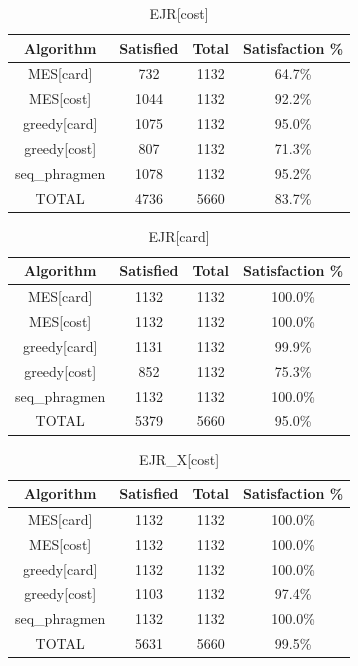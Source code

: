 

\begin{table}[h]
\centering
\begin{tabular}{cccc}
\toprule
Algorithm & Satisfied & Total & Satisfaction \% \\
\midrule
MES[card] & 732 & 1132 & 64.7\% \\
MES[cost] & 1044 & 1132 & 92.2\% \\
greedy[card] & 1075 & 1132 & 95.0\% \\
greedy[cost] & 807 & 1132 & 71.3\% \\
seq\_phragmen & 1078 & 1132 & 95.2\% \\
TOTAL & 4736 & 5660 & 83.7\% \\
\bottomrule
\end{tabular}
\caption{EJR[cost]}
\end{table}


\begin{table}[h]
\centering
\begin{tabular}{cccc}
\toprule
Algorithm & Satisfied & Total & Satisfaction \% \\
\midrule
MES[card] & 1132 & 1132 & 100.0\% \\
MES[cost] & 1132 & 1132 & 100.0\% \\
greedy[card] & 1131 & 1132 & 99.9\% \\
greedy[cost] & 852 & 1132 & 75.3\% \\
seq\_phragmen & 1132 & 1132 & 100.0\% \\
TOTAL & 5379 & 5660 & 95.0\% \\
\bottomrule
\end{tabular}
\caption{EJR[card]}
\end{table}


\begin{table}[h]
\centering
\begin{tabular}{cccc}
\toprule
Algorithm & Satisfied & Total & Satisfaction \% \\
\midrule
MES[card] & 1132 & 1132 & 100.0\% \\
MES[cost] & 1132 & 1132 & 100.0\% \\
greedy[card] & 1132 & 1132 & 100.0\% \\
greedy[cost] & 1103 & 1132 & 97.4\% \\
seq\_phragmen & 1132 & 1132 & 100.0\% \\
TOTAL & 5631 & 5660 & 99.5\% \\
\bottomrule
\end{tabular}
\caption{EJR\_X[cost]}
\end{table}


